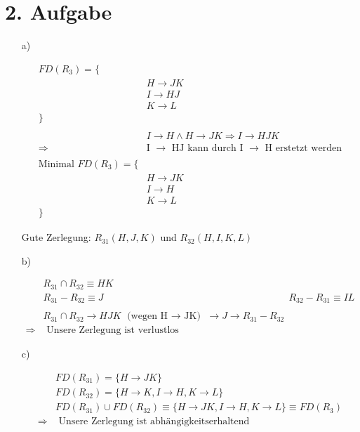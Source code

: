 \section*{2. Aufgabe}

\begin{enumerate}

\item[a)]

\begin{align*}
    FD(R_3) = \{ & \\
    & H \rightarrow JK \\
    & I \rightarrow HJ \\
    & K \rightarrow L \\
    \} & \\ \\
    & I \rightarrow H \land H \rightarrow JK \Rightarrow I \rightarrow HJK \\
    \Rightarrow & \text{I $\rightarrow$ HJ kann durch I $\rightarrow$ H erstetzt werden} \\ \\
    \text{Minimal }FD(R_3) = \{ & \\
    & H \rightarrow JK \\
    & I \rightarrow H \\
    & K \rightarrow L \\
    \} &
\end{align*}

Gute Zerlegung: $R_{31}(H,J,K)$ und $R_{32}(H,I,K,L)$

\item[b)]

\begin{align*}
    & R_{31} \cap R_{32} \equiv HK \\
    & R_{31} - R_{32} \equiv J
    & R_{32} - R_{31} \equiv IL \\ \\
    & R_{31} \cap R_{32} \rightarrow HJK \text{ (wegen H $\rightarrow$ JK) }
        \rightarrow J \rightarrow R_{31} - R_{32} \\
    \Rightarrow & \text{ Unsere Zerlegung ist verlustlos} 
\end{align*}

\item[c)]

\begin{align*}
    & FD(R_{31}) = \{ H \rightarrow JK \} \\
    & FD(R_{32}) = \{ H \rightarrow K, I \rightarrow H, K \rightarrow L \} \\
    & FD(R_{31}) \cup FD(R_{32}) \equiv \{ H \rightarrow JK, I \rightarrow H, K \rightarrow L \} \equiv FD(R_3) \\
    \Rightarrow & \text{ Unsere Zerlegung ist abhängigkeitserhaltend}
\end{align*}


\end{enumerate}

